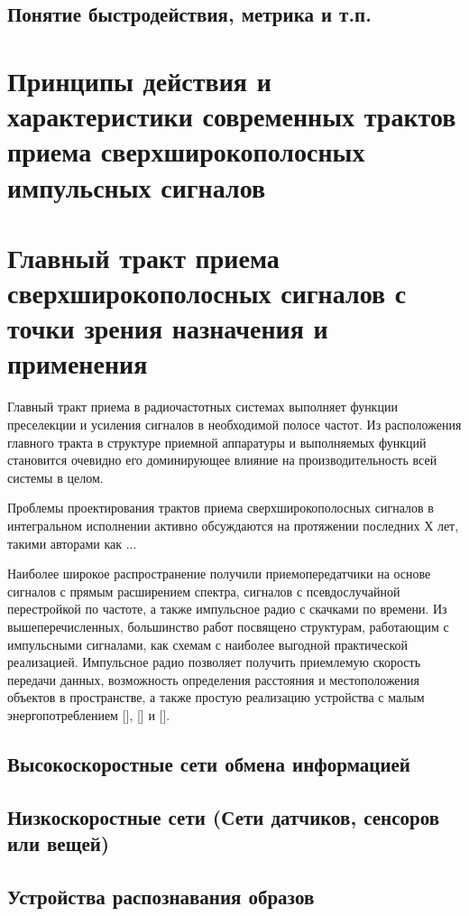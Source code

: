\subsection{Понятие быстродействия, метрика и т.п.}

\section{Принципы действия и характеристики современных трактов приема сверхширокополосных импульсных сигналов}

\section{Главный тракт приема сверхширокополосных сигналов с точки зрения назначения и применения}
Главный тракт приема в радиочастотных системах выполняет функции преселекции и усиления сигналов в необходимой полосе частот. Из расположения главного тракта в структуре приемной аппаратуры и выполняемых функций становится очевидно его доминирующее влияние на производительность всей системы в целом.

Проблемы проектирования трактов приема сверхширокополосных сигналов в интегральном исполнении активно обсуждаются на протяжении последних Х лет, такими авторами как ...

Наиболее широкое распространение получили приемопередатчики на основе сигналов с прямым расширением спектра, сигналов с псевдослучайной перестройкой по частоте, а также импульсное радио с скачками по времени. Из вышеперечисленных, большинство работ посвящено структурам, работающим с импульсными сигналами, как схемам с наиболее выгодной практической реализацией. Импульсное радио позволяет получить приемлемую скорость передачи данных, возможность определения расстояния и  местоположения объектов в пространстве, а также простую реализацию устройства с малым энергопотреблением [], [] и [].

\subsection{Высокоскоростные сети обмена информацией}

\subsection{Низкоскоростные сети (Сети датчиков, сенсоров или вещей)}

\subsection{Устройства распознавания образов}

